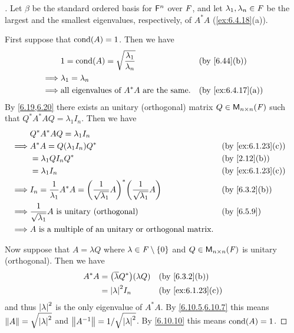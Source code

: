 \begin{proof}[]
  Let \(\beta\) be the standard ordered basis for \(\mathsf{F}^n\) over \(\mathit{F}\), and let \(\lambda_1, \lambda_n \in \mathit{F}\) be the largest and the smallest eigenvalues, respectively, of \(A^* A\) (\cref{ex:6.4.18}(a)).

  First suppose that \(\cond{A} = 1\).
  Then we have
  \begin{align*}
             & 1 = \cond{A} = \sqrt{\dfrac{\lambda_1}{\lambda_n}}     &  & \by{6.44}[b]      \\
    \implies & \lambda_1 = \lambda_n                                                         \\
    \implies & \text{all eigenvalues of } A^* A \text{ are the same}. &  & \by{ex:6.4.17}[a]
  \end{align*}
  By \cref{6.19,6.20} there exists an unitary (orthogonal) matrix \(Q \in \ms[n][n][\F]\) such that \(Q^* A^* A Q = \lambda_1 I_n\).
  Then we have
  \begin{align*}
             & Q^* A^* A Q = \lambda_1 I_n                                                                                                       \\
    \implies & A^* A = Q (\lambda_1 I_n) Q^*                                                                              &  & \by{ex:6.1.23}[c] \\
             & = \lambda_1 Q I_n Q^*                                                                                      &  & \by{2.12}[b]      \\
             & = \lambda_1 I_n                                                                                            &  & \by{ex:6.1.23}[c] \\
    \implies & I_n = \dfrac{1}{\lambda_1} A^* A = \pa{\dfrac{1}{\sqrt{\lambda_1}} A}^* \pa{\dfrac{1}{\sqrt{\lambda_1}} A} &  & \by{6.3.2}[b]     \\
    \implies & \dfrac{1}{\sqrt{\lambda_1}} A \text{ is unitary (orthogonal)}                                              &  & \by{6.5.9}        \\
    \implies & A \text{ is a multiple of an unitary or orthogonal matrix}.
  \end{align*}

  Now suppose that \(A = \lambda Q\) where \(\lambda \in \mathit{F} \setminus \left\lbrace0\right\rbrace\) and \(Q \in \ms[n][n][\F]\) is unitary (orthogonal).
  Then we have
  \begin{align*}
    A^* A & = \pa{\conj{\lambda} Q^*} (\lambda Q) &  & \by{6.3.2}[b]     \\
          & = \abs{\lambda}^2 I_n                 &  & \by{ex:6.1.23}[c]
  \end{align*}
  and thus \(\left\lvert\lambda\right\rvert^2\) is the only eigenvalue of \(A^* A\).
  By \cref{6.10.5,6.10.7} this means \(\left\lVert A\right\rVert = \sqrt{\left\lvert\lambda\right\rvert^2}\) and \(\left\lVert A^{-1}\right\rVert = 1 / \sqrt{\left\lvert\lambda\right\rvert^2}\).
  By \cref{6.10.10} this means \(\cond{A} = 1\).
\end{proof}
